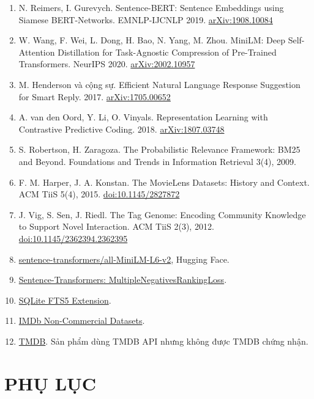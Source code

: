 \documentclass[12pt,a4paper]{article}
\newcommand{\chap}[1]{\clearpage\section{#1}}
\begin{document}
\begin{enumerate}
\def\labelenumi{\arabic{enumi}.}
\item N. Reimers, I. Gurevych. Sentence-BERT: Sentence Embeddings using Siamese BERT-Networks. EMNLP-IJCNLP 2019. \href{https://arxiv.org/abs/1908.10084}{arXiv:1908.10084}
\item W. Wang, F. Wei, L. Dong, H. Bao, N. Yang, M. Zhou. MiniLM: Deep Self-Attention Distillation for Task-Agnostic Compression of Pre-Trained Transformers. NeurIPS 2020. \href{https://arxiv.org/abs/2002.10957}{arXiv:2002.10957}
\item M. Henderson và cộng sự. Efficient Natural Language Response Suggestion for Smart Reply. 2017. \href{https://arxiv.org/abs/1705.00652}{arXiv:1705.00652}
\item A. van den Oord, Y. Li, O. Vinyals. Representation Learning with Contrastive Predictive Coding. 2018. \href{https://arxiv.org/abs/1807.03748}{arXiv:1807.03748}
\item S. Robertson, H. Zaragoza. The Probabilistic Relevance Framework: BM25 and Beyond. Foundations and Trends in Information Retrieval 3(4), 2009.
\item F. M. Harper, J. A. Konstan. The MovieLens Datasets: History and Context. ACM TiiS 5(4), 2015. \href{https://doi.org/10.1145/2827872}{doi:10.1145/2827872}
\item J. Vig, S. Sen, J. Riedl. The Tag Genome: Encoding Community Knowledge to Support Novel Interaction. ACM TiiS 2(3), 2012. \href{https://doi.org/10.1145/2362394.2362395}{doi:10.1145/2362394.2362395}
\item \href{https://huggingface.co/sentence-transformers/all-MiniLM-L6-v2}{sentence-transformers/all-MiniLM-L6-v2}, Hugging Face.
\item \href{https://sbert.net/docs/package_reference/sentence_transformer/losses.html\#multiplenegativesrankingloss}{Sentence-Transformers: MultipleNegativesRankingLoss}.
\item \href{https://www.sqlite.org/fts5.html}{SQLite FTS5 Extension}.
\item \href{https://developer.imdb.com/non-commercial-datasets/}{IMDb Non-Commercial Datasets}.
\item \href{https://www.themoviedb.org/}{TMDB}. Sản phẩm dùng TMDB API nhưng không được TMDB chứng nhận.
\end{enumerate}

\chap{PHỤ LỤC}
\end{document}
